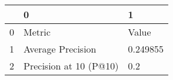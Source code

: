 \begin{tabular}{lll}
\toprule
{} &                       0 &         1 \\
\midrule
0 &                  Metric &     Value \\
1 &       Average Precision &  0.249855 \\
2 &  Precision at 10 (P@10) &       0.2 \\
\bottomrule
\end{tabular}
